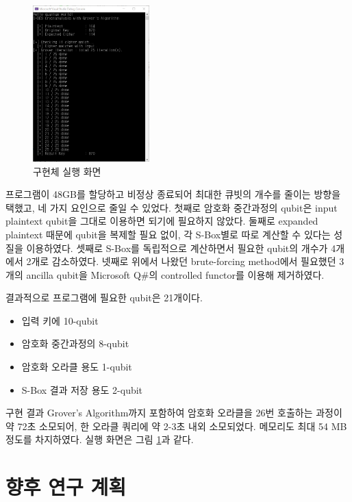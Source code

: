 \documentclass{article}
\theoremstyle{break}
\begin{document}
    \begin{figure}
        \centering
        \includegraphics[width=0.4\textwidth]{./qsharp_exec.PNG}
        \caption{구현체 실행 화면}
        \label{fig:qsharp_exec}
    \end{figure}
    
    프로그램이 48GB를 할당하고 비정상 종료되어 최대한 큐빗의 개수를 줄이는 방향을 택했고, 네 가지 요인으로 줄일 수 있었다. 첫째로 암호화 중간과정의 qubit은 input plaintext qubit을 그대로 이용하면 되기에 필요하지 않았다. 둘째로 expanded plaintext 때문에 qubit을 복제할 필요 없이, 각 S-Box별로 따로 계산할 수 있다는 성질을 이용하였다. 셋째로 S-Box를 독립적으로 계산하면서 필요한 qubit의 개수가 4개에서 2개로 감소하였다. 넷째로 위에서 나왔던 brute-forcing method에서 필요했던 3개의 ancilla qubit을 Microsoft Q\#의 controlled functor를 이용해 제거하였다.
    
    결과적으로 프로그램에 필요한 qubit은 21개이다.
    \begin{itemize}
        \item 입력 키에 10-qubit
        \item 암호화 중간과정의 8-qubit
        \item 암호화 오라클 용도 1-qubit
        \item S-Box 결과 저장 용도 2-qubit
    \end{itemize}
    구현 결과 Grover's Algorithm까지 포함하여 암호화 오라클을 26번 호출하는 과정이 약 72초 소모되어, 한 오라클 쿼리에 약 2-3초 내외 소모되었다. 메모리도 최대 54 MB 정도를 차지하였다. 실행 화면은 그림 \ref{fig:qsharp_exec}과 같다.
    
	\section{향후 연구 계획}
	
\end{document}

